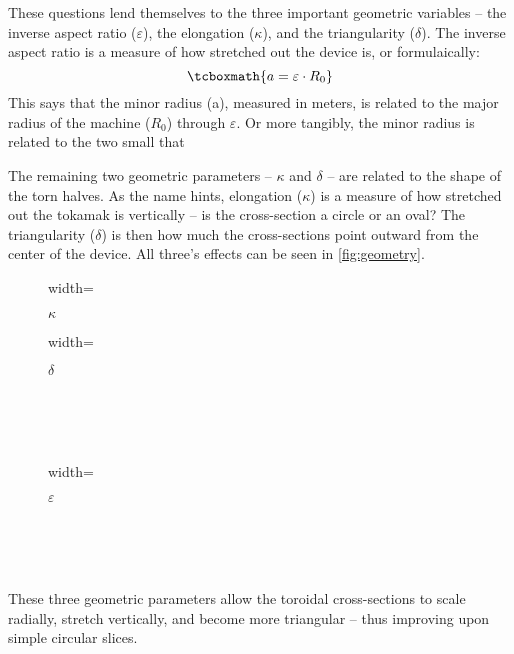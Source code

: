 These questions lend themselves to the three important geometric variables -- the inverse aspect ratio ($\varepsilon$), the elongation ($\kappa$), and the triangularity ($\delta$). The inverse aspect ratio is a measure of how stretched out the device is, or formulaically:
\begin{equation}
	\label{eq:a}
	\tcboxmath{
	a = \varepsilon \cdot R_0
	}
\end{equation}
This says that the minor radius (a), measured in meters, is related to the major radius of the machine ($R_0$) through $\varepsilon$. Or more tangibly, the minor radius is related to the two small  that 

The remaining two geometric parameters -- $\kappa$ and $\delta$ -- are related to the shape of the torn halves. As the name hints, elongation ($\kappa$) is a measure of how stretched out the tokamak is vertically -- is the cross-section a circle or an oval? The triangularity ($\delta$) is then how much the cross-sections point outward from the center of the device. All three's effects can be seen in \cref{fig:geometry}. 

\begin{figure*}[h]
    \centering
    \hfill
    \begin{subfigure}[t]{0.45\textwidth}
        \centering
		\begin{adjustbox}{width=\textwidth}
			\Large
			
		\end{adjustbox}
        \caption{$\kappa$}
    \end{subfigure}
    \hfill
    \begin{subfigure}[t]{0.45\textwidth}
        \centering
		\begin{adjustbox}{width=\textwidth}
			\Large
			
		\end{adjustbox}
        \caption{$\delta$}
    \end{subfigure}
    \hfill \hfill ~\\ ~\\ ~\\
    \begin{subfigure}[t]{0.6\textwidth}
        \centering
		\begin{adjustbox}{width=\textwidth}
			\large
			
		\end{adjustbox}
        \caption{$\varepsilon$}
    \end{subfigure} ~\\ ~\\
    \caption{Geometric Parameters} ~\\
    \small These three geometric parameters allow the toroidal cross-sections to scale radially, stretch vertically, and become more triangular -- thus improving upon simple circular slices.
    \label{fig:geometry}
\end{figure*}

